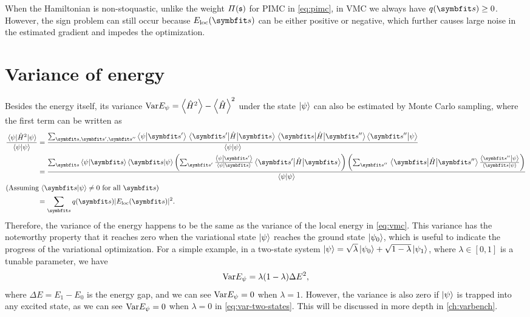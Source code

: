 When the Hamiltonian is non-stoquastic, unlike the weight $\varPi(\mathfrak{s})$ for PIMC in \cref{eq:pimc}, in VMC we always have $q(\vs) \ge 0$. However, the sign problem can still occur because $E_\text{loc}(\vs)$ can be either positive or negative, which further causes large noise in the estimated gradient and impedes the optimization.

\section{Variance of energy}
\label{sec:vmc-var}

Besides the energy itself, its variance $\Var E_\psi = \ev{\hat{H}^2} - \ev{\hat{H}}^2$ under the state $\ket{\psi}$ can also be estimated by Monte Carlo sampling, where the first term can be written as
\begin{align}
\frac{\ev{\hat{H}^2}{\psi}}{\ip{\psi}}
&= \frac
{\sum_{\vs, \vs', \vs''} \ip{\psi}{\vs'} \mel{\vs'}{\hat{H}}{\vs} \mel{\vs}{\hat{H}}{\vs''} \ip{\vs''}{\psi}}
{\ip{\psi}} \label{eq:vmc-var-1} \\
&= \frac
{\sum_\vs \ip{\psi}{\vs} \ip{\vs}{\psi}
\left( \sum_{\vs'} \frac{\ip{\psi}{\vs'}}{\ip{\psi}{\vs}} \mel{\vs'}{\hat{H}}{\vs} \right)
\left( \sum_{\vs''} \mel{\vs}{\hat{H}}{\vs''} \frac{\ip{\vs''}{\psi}}{\ip{\vs}{\psi}} \right)}
{\ip{\psi}} \label{eq:vmc-var-2} \\
\shortintertext{(Assuming $\ip{\vs}{\psi} \neq 0$ for all $\vs$)}
&= \sum_\vs q(\vs) |E_\text{loc}(\vs)|^2. \label{eq:vmc-var}
\end{align}
Therefore, the variance of the energy happens to be the same as the variance of the local energy in \cref{eq:vmc}. This variance has the noteworthy property that it reaches zero when the variational state $\ket{\psi}$ reaches the ground state $\ket{\psi_0}$, which is useful to indicate the progress of the variational optimization. For a simple example, in a two-state system $\ket{\psi} = \sqrt{\lambda} \ket{\psi_0} + \sqrt{1 - \lambda} \ket{\psi_1}$, where $\lambda \in [0, 1]$ is a tunable parameter, we have
\begin{equation}
\mathrm{Var} E_\psi = \lambda (1 - \lambda) \Delta E^2, \label{eq:var-two-states}
\end{equation}
where $\Delta E = E_1 - E_0$ is the energy gap, and we can see $\mathrm{Var} E_\psi = 0$ when $\lambda = 1$. However, the variance is also zero if $\ket{\psi}$ is trapped into any excited state, as we can see $\mathrm{Var} E_\psi = 0$ when $\lambda = 0$ in \cref{eq:var-two-states}. This will be discussed in more depth in \cref{ch:varbench}.

